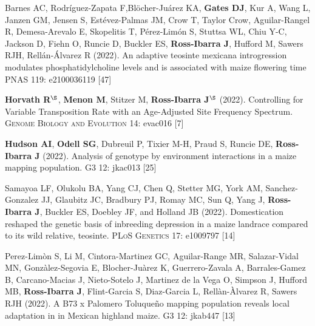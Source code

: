 \documentclass[letterpaper,10pt]{article}
\begin{document}
\begin{etaremune}
\item Barnes AC, Rodr\'iguez-Zapata F,Bl\"{o}cher-Ju\'arez KA, \textbf{Gates DJ}, Kur A,  Wang L, Janzen GM,  Jensen S, Est\'evez-Palmas JM, Crow T, Taylor Crow, Aguilar-Rangel R, Demesa-Arevalo E, Skopelitis T, P\'erez-Lim\'on S, Stuttsa WL, Chiu Y-C, Jackson D, Fiehn O, Runcie D, Buckler ES, \textbf{Ross-Ibarra J}, Hufford M, Sawers RJH, Rell\'an-\'Alvarez R (2022). An adaptive teosinte mexicana introgression modulates phosphatidylcholine levels and is associated with maize flowering time \textsc{PNAS} 119: e2100036119  %
 [47]\\

\item \textbf{Horvath R}$^\S$, \textbf{Menon M}, Stitzer M, \textbf{Ross-Ibarra J}$^\S$ (2022). Controlling for Variable Transposition Rate with an Age-Adjusted Site Frequency Spectrum. \textsc{Genome Biology and Evolution}  14: evac016 %
 [7]\\

\item \textbf{Hudson AI}, \textbf{Odell SG}, Dubreuil P, Tixier M-H, Praud S, Runcie DE, \textbf{Ross-Ibarra J} (2022).  Analysis of genotype by environment interactions in a maize mapping population. \textsc{G3} 12: jkac013 %
 [25]\\

\item  Samayoa LF, Olukolu  BA, Yang CJ, Chen Q, Stetter MG, York AM, Sanchez-Gonzalez JJ,  Glaubitz JC, Bradbury PJ,  Romay MC, Sun Q, Yang J, \textbf{Ross-Ibarra J}, Buckler ES, Doebley JF, and Holland JB (2022).   Domestication reshaped the genetic basis of inbreeding depression in a maize landrace compared to its wild relative, teosinte. \textsc{PLoS Genetics} 17: e1009797 %
 [14]\\

\item Perez-Lim\`{o}n S, Li M, Cintora-Martinez GC, Aguilar-Range MR, Salazar-Vidal MN, Gonz\`{a}lez-Segovia E, Blocher-Ju\`{a}rez K, Guerrero-Zavala A, Barrales-Gamez B, Carcano-Macias J,  Nieto-Sotelo J, Martinez de la Vega O, Simpson J, Hufford MB, \textbf{Ross-Ibarra J}, Flint-Garcia S, Diaz-Garcia L, Rell\`{a}n-\`{A}lvarez R, Sawers RJH (2022). A B73 x Palomero Toluque\~{n}o mapping population reveals local adaptation in in Mexican highland maize. \textsc{G3} 12: jkab447 %
 [13]\\


\end{etaremune}
\end{document}
